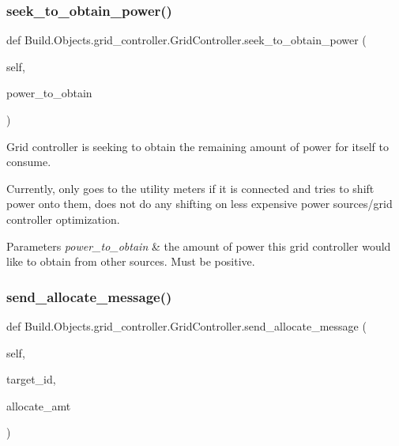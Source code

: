 \subsubsection{\texorpdfstring{seek\+\_\+to\+\_\+obtain\+\_\+power()}{seek\_to\_obtain\_power()}}
{\footnotesize\ttfamily def Build.\+Objects.\+grid\+\_\+controller.\+Grid\+Controller.\+seek\+\_\+to\+\_\+obtain\+\_\+power (\begin{DoxyParamCaption}\item[{}]{self,  }\item[{}]{power\+\_\+to\+\_\+obtain }\end{DoxyParamCaption})}



Grid controller is seeking to obtain the remaining amount of power for itself to consume. 

Currently, only goes to the utility meters if it is connected and tries to shift power onto them, does not do any shifting on less expensive power sources/grid controller optimization. 
\begin{DoxyParams}{Parameters}
{\em power\+\_\+to\+\_\+obtain} & the amount of power this grid controller would like to obtain from other sources. Must be positive. \\
\hline
\end{DoxyParams}
\mbox{\label{class_build_1_1_objects_1_1grid__controller_1_1_grid_controller_a5ff206d2afccf703eef39dafadce5124}} 
\subsubsection{\texorpdfstring{send\+\_\+allocate\+\_\+message()}{send\_allocate\_message()}}
{\footnotesize\ttfamily def Build.\+Objects.\+grid\+\_\+controller.\+Grid\+Controller.\+send\+\_\+allocate\+\_\+message (\begin{DoxyParamCaption}\item[{}]{self,  }\item[{}]{target\+\_\+id,  }\item[{}]{allocate\+\_\+amt }\end{DoxyParamCaption})}



